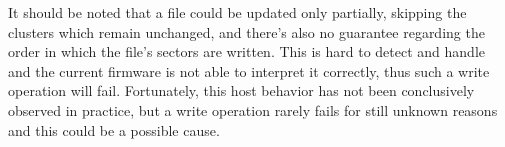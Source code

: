 It should be noted that a file could be updated only partially, skipping the clusters which remain unchanged, and there's also no guarantee regarding the order in which the file's sectors are written. This is hard to detect and handle and the current firmware is not able to interpret it correctly, thus such a write operation will fail. Fortunately, this host behavior has not been conclusively observed in practice, but a write operation rarely fails for still unknown reasons and this could be a possible cause.








































